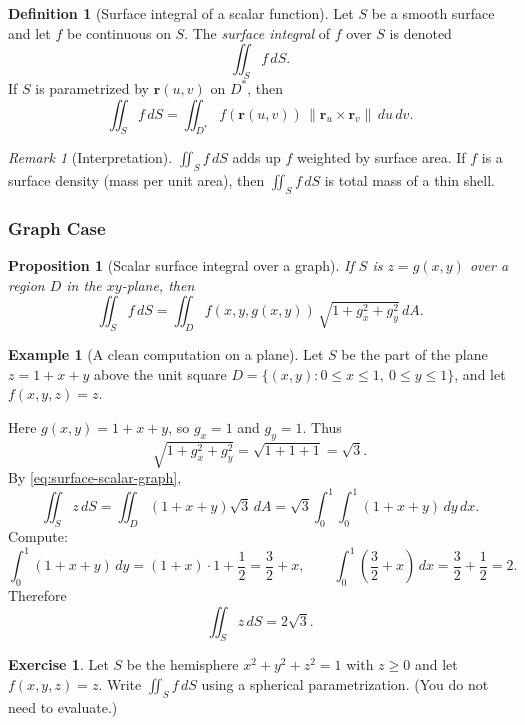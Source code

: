 \documentclass[12pt]{article}
\numberwithin{equation}{section}
\newcommand{\vect}[1]{\boldsymbol{#1}}   %
\theoremstyle{plain}
\newtheorem{proposition}[theorem]{Proposition}
\theoremstyle{definition}
\newtheorem{definition}[theorem]{Definition}
\newtheorem{example}[theorem]{Example}
\newtheorem{exercise}[theorem]{Exercise}
\theoremstyle{remark}
\newtheorem{remark}[theorem]{Remark}
\begin{document}
\begin{definition}[Surface integral of a scalar function]\label{def:surface-scalar}
Let $S$ be a smooth surface and let $f$ be continuous on $S$. The \emph{surface integral} of $f$ over $S$ is denoted
\[
\iint_S f\,dS.
\]
If $S$ is parametrized by $\vect r(u,v)$ on $D^\ast$, then
\begin{equation}\label{eq:surface-scalar-param}
\iint_S f\,dS
=
\iint_{D^\ast} f(\vect r(u,v))\,\bigl\|\vect r_u\times \vect r_v\bigr\|\,du\,dv.
\end{equation}
\end{definition}

\begin{remark}[Interpretation]
$\iint_S f\,dS$ adds up $f$ weighted by surface area.  
If $f$ is a surface density (mass per unit area), then $\iint_S f\,dS$ is total mass of a thin shell.
\end{remark}

\subsubsection{Graph Case}

\begin{proposition}[Scalar surface integral over a graph]\label{prop:surface-scalar-graph}
If $S$ is $z=g(x,y)$ over a region $D$ in the $xy$-plane, then
\begin{equation}\label{eq:surface-scalar-graph}
\iint_S f\,dS
=
\iint_D f(x,y,g(x,y))\,\sqrt{1+g_x^2+g_y^2}\,dA.
\end{equation}
\end{proposition}

\begin{example}[A clean computation on a plane]\label{ex:scalar-plane}
Let $S$ be the part of the plane $z=1+x+y$ above the unit square $D=\{(x,y):0\le x\le 1,\ 0\le y\le 1\}$, and let $f(x,y,z)=z$.

Here $g(x,y)=1+x+y$, so $g_x=1$ and $g_y=1$. Thus
\[
\sqrt{1+g_x^2+g_y^2}=\sqrt{1+1+1}=\sqrt{3}.
\]
By \cref{eq:surface-scalar-graph},
\[
\iint_S z\,dS
=\iint_D (1+x+y)\sqrt{3}\,dA
=\sqrt{3}\int_{0}^{1}\int_{0}^{1}(1+x+y)\,dy\,dx.
\]
Compute:
\[
\int_{0}^{1}(1+x+y)\,dy=(1+x)\cdot 1+\frac12=\frac32+x,
\qquad
\int_{0}^{1}\left(\frac32+x\right)\,dx=\frac32+\frac12=2.
\]
Therefore
\[
\iint_S z\,dS = 2\sqrt{3}.
\]
\end{example}

\begin{exercise}
Let $S$ be the hemisphere $x^2+y^2+z^2=1$ with $z\ge 0$ and let $f(x,y,z)=z$.
Write $\iint_S f\,dS$ using a spherical parametrization. (You do not need to evaluate.)
\end{exercise}
\end{document}
